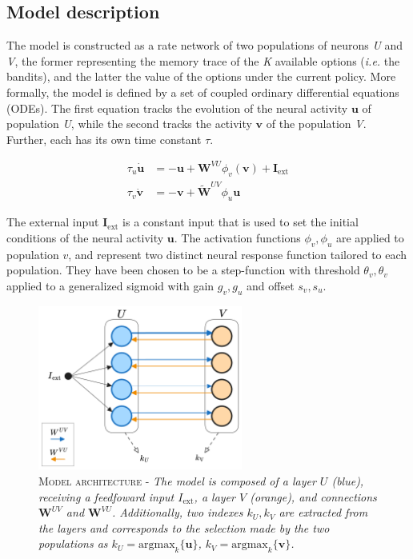 
\subsection{Model description}
The model is constructed as a rate network of two populations of neurons \textit{U} and \textit{V}, the former representing the memory trace of the \textit{K} available options (\textit{i.e.} the bandits), and the latter the value of the options under the current policy.
More formally, the model is defined by a set of coupled ordinary differential equations (ODEs).
The first equation tracks the evolution of the neural activity $\textbf{u}$ of population \textit{U}, while the second tracks the activity $\textbf{v}$ of the population \textit{V}. Further, each has its own time constant $\tau$.

\begin{equation}
\begin{aligned}
    \tau_{u} \dot{\textbf{u}}&= -\textbf{u} + \textbf{W}^{VU}\phi_{v}(\textbf{v}) + \textbf{I}_{\text{ext}} \\
    \tau_{v} \dot{\textbf{v}}&= -\textbf{v} + \tilde{\textbf{W}}^{UV}\phi_{u}\textbf{u}
\end{aligned}
\end{equation}\label{eq:main}

\noindent The external input $\textbf{I}_{\text{ext}}$ is a constant input that is used to set the initial conditions of the neural activity $\textbf{u}$.
The activation functions $\phi_{v},\phi_{u}$ are applied to population $v$, and represent two distinct neural response function tailored to each population. They have been chosen to be a step-function with threshold $\theta_{v},\theta_{v}$ applied to a generalized sigmoid with gain $g_{v},g_{u}$ and offset $s_{v},s_{u}$.

\begin{figure}[ht]
    \centering
    \includegraphics[width=0.6\textwidth]{figures/minb_architecture.png}
    \caption{\textsc{Model architecture} - \textit{The model is composed of a layer $U$ (blue), receiving a feedfoward input $I_{\text{ext}}$, a layer $V$ (orange), and connections $\textbf{W}^{UV}$ and $\textbf{W}^{VU}$. Additionally, two indexes $k_{U}, k_{V}$  are extracted from the layers and
    corresponds to the selection made by the two populations as $k_{U}=\text{argmax}_{k} \{\textbf{u}\}$, $k_{V}=\text{argmax}_{k} \{\textbf{v}\}$.}}
    \label{fig:main_architecture}
\end{figure}


